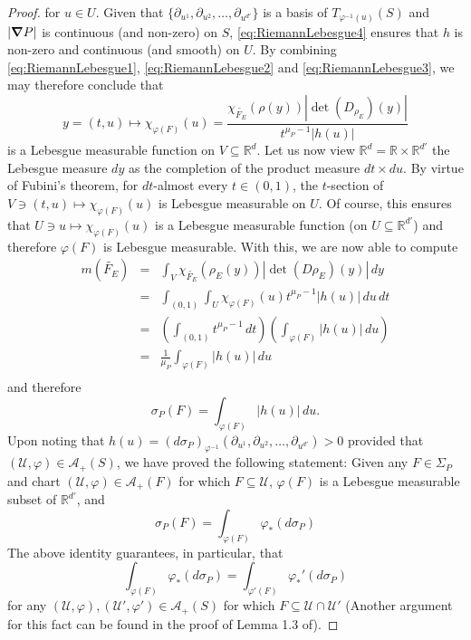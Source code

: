 \documentclass[11pt]{article}
\renewcommand\det{\operatorname{det}}
\begin{document}
\begin{proof}
for $u\in U$. Given that $\{\partial_{u^1},\partial_{u^2},\dots,\partial_{u^{d'}}\}$ is a basis of $T_{\varphi^{-1}(u)}(S)$ and $|\grad P|$ is continuous (and non-zero) on $S$, \eqref{eq:RiemannLebesgue4} ensures that $h$ is non-zero and continuous (and smooth) on $U$. By combining \eqref{eq:RiemannLebesgue1}, \eqref{eq:RiemannLebesgue2} and \eqref{eq:RiemannLebesgue3}, we may therefore conclude that
\begin{equation*}  y=(t,u)\mapsto\chi_{\varphi(F)}(u)=\frac{\chi_{\widetilde{F_E}}(\rho(y))|\det(D_{\rho_E})(y)|}{t^{\mu_P-1}|h(u)|}
\end{equation*}
is a Lebesgue measurable function on $V\subseteq\mathbb{R}^d$. Let us now view $\mathbb{R}^d=\mathbb{R}\times\mathbb{R}^{d'}$ the Lebesgue measure $dy$ as the completion of the product measure $dt\times du$. By virtue of Fubini's theorem, for $dt$-almost every $t\in (0,1)$, the $t$-section of $V\ni(t,u)\mapsto\chi_{\varphi(F)}(u)$ is Lebesgue measurable on $U$. Of course, this ensures that $U\ni u\mapsto \chi_{\varphi(F)}(u)$ is a Lebesgue measurable function (on $U\subseteq\mathbb{R}^{d'}$) and therefore $\varphi(F)$ is Lebesgue measurable. With this, we are now able to compute
\begin{eqnarray*}
    m(\widetilde{F_E})
    &=&\int_{V}\chi_{\widetilde{F_E}}(\rho_E(y))|\det(D\rho_E)(y)|\,dy\\
    &=&\int_{(0,1)}\int_U \chi_{\varphi(F)}(u)t^{\mu_P-1}|h(u)|\,du\,dt\\
    &=&\left(\int_{(0,1)}t^{\mu_P-1}\,dt\right)\left(\int_{\varphi(F)}|h(u)|\,du\right)\\
    &=&\frac{1}{\mu_P}\int_{\varphi(F)}|h(u)|\,du\\
\end{eqnarray*}
and therefore
\begin{equation*}
    \sigma_P(F)=\int_{\varphi(F)}|h(u)|\,du. 
\end{equation*}
Upon noting that $h(u)=(d\sigma_P)_{\varphi^{-1}}(\partial_{u^1},\partial_{u^2},\dots,\partial_{u^{d'}})>0$ provided that $(\mathcal{U},\varphi)\in\mathcal{A}_+(S)$, we have proved the following statement: Given any $F\in\Sigma_P$ and chart $(\mathcal{U},\varphi)\in\mathcal{A}_+(F)$ for which $F\subseteq\mathcal{U}$, $\varphi(F)$ is a Lebesgue measurable subset of $\mathbb{R}^{d'}$, and
\begin{equation}\label{eq:RiemannLebesgue5}
    \sigma_P(F)=\int_{\varphi(F)}\varphi_*(d\sigma_P)
\end{equation}
The above identity guarantees, in particular, that 
\begin{equation*}
    \int_{\varphi(F)}\varphi_*(d\sigma_P)=\int_{\varphi'(F)}\varphi_*'(d\sigma_P)
\end{equation*}
for any $(\mathcal{U},\varphi),(\mathcal{U}',\varphi')\in\mathcal{A}_+(S)$ for which $F\subseteq \mathcal{U}\cap\mathcal{U}'$ (Another argument for this fact can be found in the proof of Lemma 1.3 of). 


\end{proof}
\end{document}
